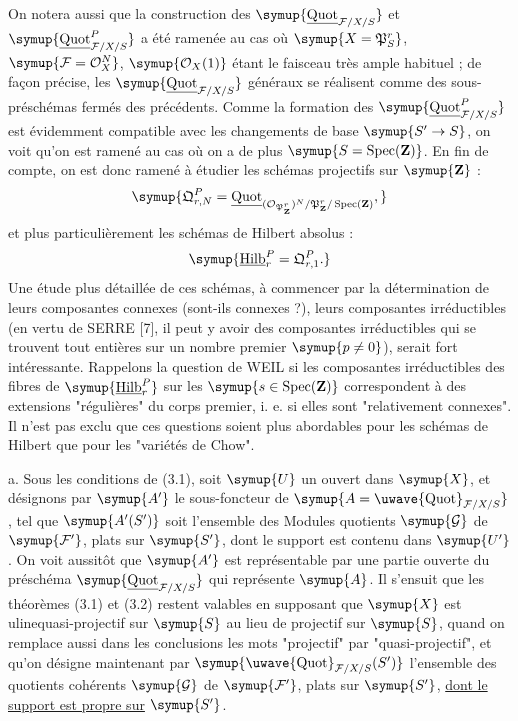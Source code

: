  On notera aussi que la construction des
$\symup{\underline{\operatorname{Quot}}_{\mathcal F/X/S}}$ et
$\symup{\underline{\operatorname{Quot}}^P_{\mathcal F/X/S}}$ a été ramenée au cas où
$\symup{X=\mathfrak P^r_S}$, $\symup{\mathcal F=\mathcal O_X^N}$, $\symup{\mathcal O_X(1)}$ étant le
faisceau très ample habituel ; de façon précise, les
$\symup{\underline{\operatorname{Quot}}_{\mathcal F/X/S}}$ généraux se réalisent comme des
sous-préschémas fermés des précédents. Comme la formation des
$\symup{\underline{\operatorname{Quot}}^P_{\mathcal F/X/S}}$ est évidemment compatible avec les
changements de base $\symup{S'\to S}$, on voit qu'on est ramené au cas où
on a de plus $\symup{S=\operatorname{Spec}(\mathbf Z)}$. En fin de compte, on est donc
ramené à étudier les schémas projectifs sur $\symup{\mathbf Z}$ :
\[
\symup{\mathfrak Q^P_{r,N}=
\underline{\operatorname{Quot}}_{(\mathcal O_{\mathfrak P^r_{\mathbf Z}})^N/
\mathfrak P^r_{\mathbf Z}/\operatorname{Spec}(\mathbf Z)},}
\]
et plus particulièrement les schémas de Hilbert absolus :
\[
\symup{\underline{\operatorname{Hilb}}^P_r=\mathfrak Q^P_{r,1}.}
\]
Une étude plus détaillée de ces schémas, à commencer par la détermination de
leurs composantes connexes (sont-ils connexes ?), leurs composantes irréductibles (en
vertu de SERRE [7], il peut y avoir des composantes irréductibles qui se
trouvent tout entières sur un nombre premier $\symup{p\neq0}$), serait fort
intéressante. Rappelons la question de WEIL si les composantes irréductibles des
fibres de $\symup{\underline{\operatorname{Hilb}}^P_r}$ sur les
$\symup{s\in\operatorname{Spec}(\mathbf Z)}$ correspondent à des extensions
"régulières" du corps premier, i. e. si elles sont "relativement connexes".
Il n'est pas exclu que ces questions soient plus abordables pour les schémas de
Hilbert que pour les "variétés de Chow".


\noindent a. Sous les conditions de (3.1), soit $\symup{U}$ un ouvert dans $\symup{X}$, et
désignons par $\symup{A'}$ le sous-foncteur de
$\symup{A=\mathop{\text{\uwave{Quot}}}\nolimits_{\mathcal F/X/S}}$, tel que $\symup{A'(S')}$ soit
l'ensemble des Modules quotients $\symup{\mathcal G}$ de $\symup{\mathcal F'}$, plats sur
$\symup{S'}$, dont le support est contenu dans $\symup{U'}$. On voit aussitôt que $\symup{A'}$ est
représentable par une partie ouverte du préschéma
$\symup{\underline{\operatorname{Quot}}_{\mathcal F/X/S}}$ qui représente $\symup{A}$. Il s'ensuit que les
théorèmes (3.1) et (3.2)
restent valables en supposant que $\symup{X}$ est \\uline{quasi-projectif} sur $\symup{S}$ au lieu de
projectif sur $\symup{S}$, quand on remplace aussi dans les conclusions les mots
"projectif" par "quasi-projectif", et qu'on désigne maintenant par
$\symup{\mathop{\text{\uwave{Quot}}}\nolimits_{\mathcal F/X/S}(S')}$ l'ensemble des
quotients cohérents $\symup{\mathcal G}$ de $\symup{\mathcal F'}$, plats sur $\symup{S'}$, \uline{dont le support est propre sur} $\symup{S'}$.

